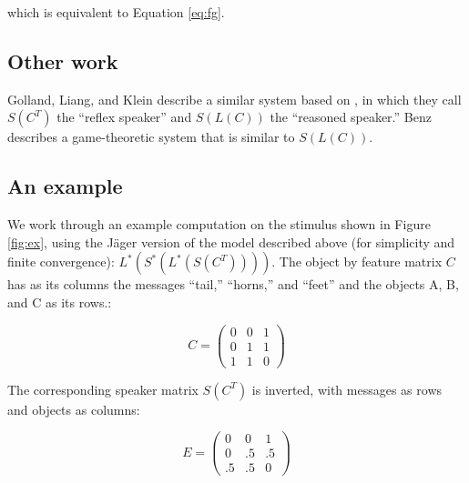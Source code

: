 \documentclass[man,noapacite]{apa2}
\begin{document}
which is equivalent to Equation \ref{eq:fg}.

\subsection{Other work}

Golland, Liang, and Klein \cite{golland2010} describe a similar system based on \cite{jaegerinpress}, in which they call $S(C^T)$ the ``reflex speaker'' and $S(L(C))$ the ``reasoned speaker.'' Benz \cite{benz2005b} describes a game-theoretic system that is similar to $S(L(C))$. 

\subsection{An example}


We work through an example computation on the stimulus shown in Figure \ref{fig:ex}, using the J\"ager \cite{jaegerinpress} version of the model described above (for simplicity and finite convergence): $L^*(S^*(L^*(S(C^T))))$. The object by feature matrix $C$ has as its columns the messages ``tail,'' ``horns,'' and ``feet'' and the objects A, B, and C as its rows.:

\begin{equation}
C= \left(
    \begin{array}{ccc}
      0 & 0 & 1 \\
      0 & 1 & 1\\
      1 & 1 & 0 
    \end{array} 
  \right)
\end{equation}

The corresponding speaker matrix $S(C^T)$ is inverted, with messages as rows and objects as columns: 

\begin{equation}
E = \left(
    \begin{array}{ccc}
      0 & 0 & 1 \\
      0 & .5 & .5\\
      .5 & .5 & 0 
    \end{array} 
  \right)
\end{equation}
\end{document}
